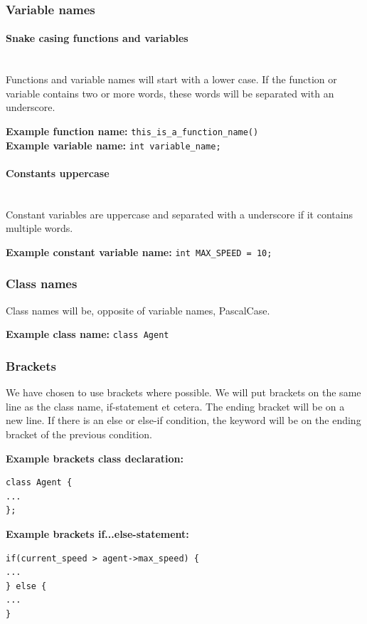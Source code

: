\subsubsection{Variable names}
\paragraph{Snake casing functions and variables}
~\\Functions and variable names will start with a lower case. If the function or variable contains two or more words, these words will be separated with an underscore.

\textbf{Example function name:} \lstinline{this_is_a_function_name()}
~\\\textbf{Example variable name:} \lstinline{int variable_name;}

\paragraph{Constants uppercase}
~\\Constant variables are uppercase and separated with a underscore if it contains multiple words.

\textbf{Example constant variable name:} \lstinline{int MAX_SPEED = 10;}

\subsubsection{Class names}
Class names will be, opposite of variable names, PascalCase.

\textbf{Example class name:} \lstinline{class Agent}\clearpage

\subsubsection{Brackets}
We have chosen to use brackets where possible. We will put brackets on the same line as the class name, if-statement et cetera. The ending bracket will be on a new line.
If there is an else or else-if condition, the keyword will be on the ending bracket of the previous condition.

\textbf{Example brackets class declaration:}
\begin{lstlisting}
class Agent {
...
};
\end{lstlisting}

\textbf{Example brackets if...else-statement:}
\begin{lstlisting}
if(current_speed > agent->max_speed) {
...
} else {
... 
}
\end{lstlisting}

